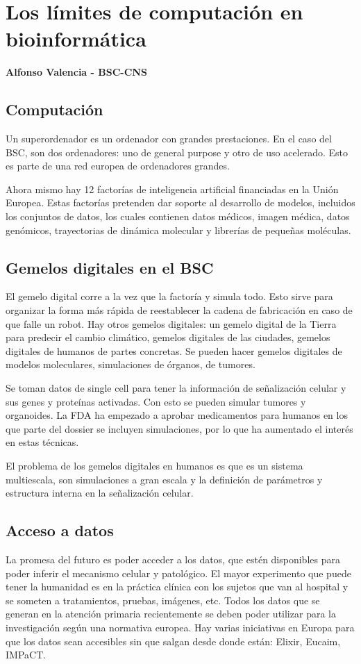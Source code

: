 \section{Los límites de computación en bioinformática}
\textbf{Alfonso Valencia - BSC-CNS}

\subsection{Computación}
Un superordenador es un ordenador con grandes prestaciones. En el caso del BSC, son dos ordenadores: uno de general purpose y otro de uso acelerado. Esto es parte de una red europea de ordenadores grandes. 

Ahora mismo hay 12 factorías de inteligencia artificial financiadas en la Unión Europea. Estas factorías pretenden dar soporte al desarrollo de modelos, incluidos los conjuntos de datos, los cuales contienen datos médicos, imagen médica, datos genómicos, trayectorias de dinámica molecular y librerías de pequeñas moléculas. 

\subsection{Gemelos digitales en el BSC}
El gemelo digital corre a la vez que la factoría y simula todo. Esto sirve para organizar la forma más rápida de reestablecer la cadena de fabricación en caso de que falle un robot. Hay otros gemelos digitales: un gemelo digital de la Tierra para predecir el cambio climático, gemelos digitales de las ciudades, gemelos digitales de humanos de partes concretas. Se pueden hacer gemelos digitales de modelos moleculares, simulaciones de órganos, de tumores. 

Se toman datos de single cell para tener la información de señalización celular y sus genes y proteínas activadas. Con esto se pueden simular tumores y organoides. La FDA ha empezado a aprobar medicamentos para humanos en los que parte del dossier se incluyen simulaciones, por lo que ha aumentado el interés en estas técnicas. 

El problema de los gemelos digitales en humanos es que es un sistema multiescala, son simulaciones a gran escala y la definición de parámetros y estructura interna en la señalización celular. 

\subsection{Acceso a datos}
La promesa del futuro es poder acceder a los datos, que estén disponibles para poder inferir el mecanismo celular y patológico. El mayor experimento que puede tener la humanidad es en la práctica clínica con los sujetos que van al hospital y se someten a tratamientos, pruebas, imágenes, etc. Todos los datos que se generan en la atención primaria recientemente se deben poder utilizar para la investigación según una normativa europea. Hay varias iniciativas en Europa para que los datos sean accesibles sin que salgan desde donde están: Elixir, Eucaim, IMPaCT. 

